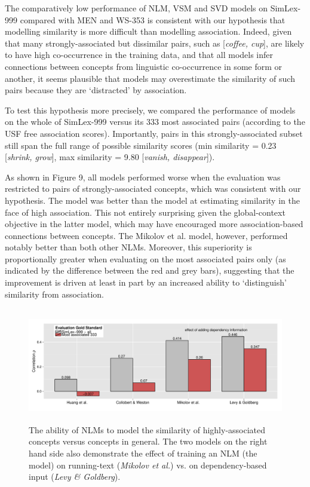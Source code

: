 The comparatively low performance of NLM, VSM and SVD models on SimLex-999 compared with MEN and WS-353 is consistent with our hypothesis that modelling similarity is more difficult than modelling association. Indeed, given that many strongly-associated but dissimilar pairs, such as [\emph{coffee, cup}], are likely to have high co-occurrence in the training data, and that all models infer connections between concepts from linguistic co-occurrence in some form or another, it seems plausible that models may overestimate the similarity of such pairs because they are `distracted' by association.

To test this hypothesis more precisely, we compared the performance of models on the whole of SimLex-999 versus its 333 most associated pairs (according to the USF free association scores). Importantly, pairs in this strongly-associated subset still span the full range of possible similarity scores (min similarity = 0.23 [\emph{shrink, grow}], max similarity = 9.80 [\emph{vanish, disappear}]).     

As shown in Figure 9, all models performed worse when the evaluation was restricted to pairs of strongly-associated concepts, which was consistent with our hypothesis. The \cite{collobert2008unified} model was better than the \cite{huang2012improving} model at estimating similarity in the face of high association. This not entirely surprising given the global-context objective in the latter model, which may have encouraged more association-based connections between concepts. The Mikolov et al. model, however, performed notably better than both other NLMs. Moreover, this superiority is proportionally greater when evaluating on the most associated pairs only (as indicated by the difference between the red and grey bars), suggesting that the improvement is driven at least in part by an increased ability to `distinguish' similarity from association. 

\begin{figure}[]  \includegraphics[width = \textwidth,height=5cm]{Chapter_3/Figure_3A_CL}  \caption{The ability of NLMs to model the similarity of highly-associated concepts versus concepts in general. The two models on the right hand side also demonstrate the effect of training an NLM (the \protect\cite{mikolov2013efficient} model) on running-text (\emph{Mikolov et al.}) vs. on dependency-based input (\emph{Levy \& Goldberg}).}\end{figure}

